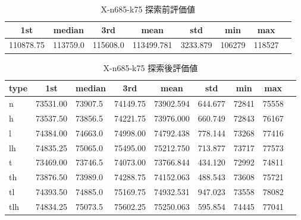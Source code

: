 \begin{table}[htbp]
    \centering
    \caption{X-n685-k75 探索前評価値}
    \begin{tabular}{|l|l|l|l|l|l|l|l|}\hline
    \multicolumn{1}{|c|}{\textbf{1st}}
    &\multicolumn{1}{c|}{\textbf{median}}
    &\multicolumn{1}{c|}{\textbf{3rd}}
    &\multicolumn{1}{c|}{\textbf{mean}}
    &\multicolumn{1}{c|}{\textbf{std}}
    &\multicolumn{1}{c|}{\textbf{min}}
    &\multicolumn{1}{c|}{\textbf{max}}\\\hline
	110878.75 & 113759.0 & 115608.0 & 113499.781 & 3233.879 & 106279 & 118527\\\hline
	\end{tabular}
\end{table}
\begin{table}[htbp]
    \centering
    \caption{X-n685-k75 探索後評価値}
    \begin{tabular}{|l|l|l|l|l|l|l|l|l|}\hline
    \multicolumn{1}{|c|}{\textbf{type}}
    &\multicolumn{1}{|c|}{\textbf{1st}}
    &\multicolumn{1}{c|}{\textbf{median}}
    &\multicolumn{1}{c|}{\textbf{3rd}}
    &\multicolumn{1}{c|}{\textbf{mean}}
    &\multicolumn{1}{c|}{\textbf{std}}
    &\multicolumn{1}{c|}{\textbf{min}}
    &\multicolumn{1}{c|}{\textbf{max}}\\\hline
	n & 73531.00 & 73907.5 & 74149.75 & 73902.594 & 644.677 & 72841 & 75558\\\hline
	h & 73537.50 & 73856.5 & 74221.75 & 73976.000 & 660.749 & 72843 & 76167\\\hline
	l & 74384.00 & 74663.0 & 74998.00 & 74792.438 & 778.144 & 73268 & 77416\\\hline
	lh & 74835.25 & 75065.0 & 75495.00 & 75212.750 & 713.877 & 73717 & 77573\\\hline
	t & 73469.00 & 73746.5 & 74073.00 & 73766.844 & 434.120 & 72992 & 74811\\\hline
	th & 73876.50 & 73989.0 & 74288.75 & 74152.063 & 488.543 & 73608 & 75721\\\hline
	tl & 74393.50 & 74885.0 & 75169.75 & 74932.531 & 947.023 & 73558 & 78082\\\hline
	tlh & 74834.25 & 75073.5 & 75602.25 & 75250.063 & 595.854 & 74445 & 77041\\\hline
	\end{tabular}
\end{table}
